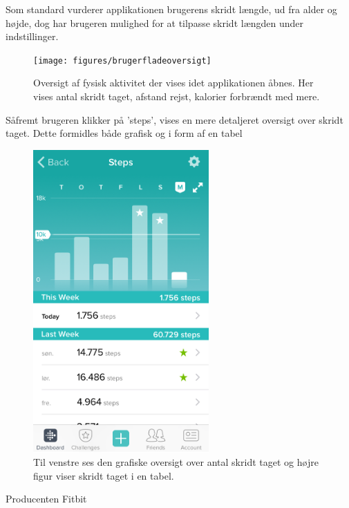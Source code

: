 Som standard vurderer applikationen brugerens skridt længde, ud fra alder og højde, dog har brugeren mulighed for at tilpasse skridt længden under indstillinger.  

\begin{figure}[H]
	\centering
	\texttt{[image: figures/brugerfladeoversigt]}
	\caption{Oversigt af fysisk aktivitet der vises idet applikationen åbnes. Her vises antal skridt taget, afstand rejst, kalorier forbrændt med mere.}
	\label{fig:brugerfladeoversigt}
\end{figure}


Såfremt brugeren klikker på 'steps', vises en mere detaljeret oversigt over skridt taget. Dette formidles både grafisk og i form af en tabel

\begin{figure}[H]
	\centering
	\includegraphics[width=0.6\textwidth]{figures/brugerfladesteps}
	\caption{Til venstre ses den grafiske oversigt over antal skridt taget og højre figur viser skridt taget i en tabel.}
	\label{fig:brugerfladesteps}
\end{figure}


 

Producenten Fitbit 			
			
